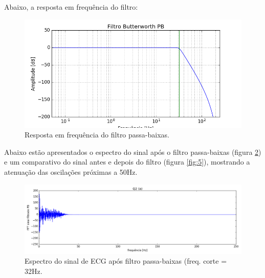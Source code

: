 \documentclass[12pt,letterpaper]{article}
\begin{document}
\begin{enumerate}[label=(\alph*)]
    Abaixo, a resposta em frequência do filtro:
            \begin{figure}[H]
            \centering
            \includegraphics[width=15cm]{TC1/images/Q2_a3_PB_respfreq.png}
            \caption{Resposta em frequência do filtro passa-baixas.}
            \label{fig:3}
        \end{figure}
    
    
    Abaixo estão apresentados o espectro do sinal após o filtro passa-baixas (figura \ref{fig:4}) e um comparativo do sinal antes e depois do filtro (figura \ref{fig:5}), mostrando a atenuação das oscilações próximas a 50Hz.
    
        \begin{figure}[H]
            \centering
            \includegraphics[width=15cm]{TC1/images/Q2_b_espectro_filt_PB.png}
            \caption{Espectro do sinal de ECG após filtro passa-baixas (freq. corte = 32Hz.}
            \label{fig:4}
        \end{figure}
    

\end{enumerate}
\end{document}
